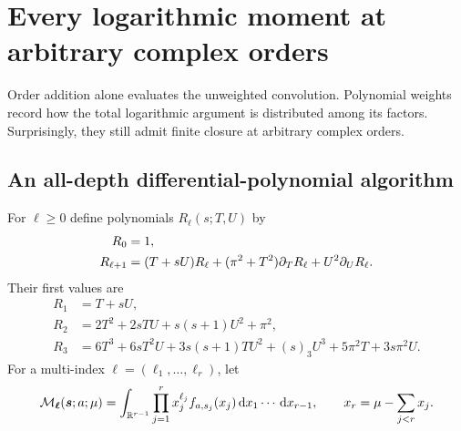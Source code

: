 \section{Every logarithmic moment at arbitrary complex orders}
\label{rlc:sec:moments}

Order addition alone evaluates the unweighted convolution. Polynomial
weights record how the total logarithmic argument is distributed among
its factors. Surprisingly, they still admit finite closure at arbitrary
complex orders.

\subsection{An all-depth differential-polynomial algorithm}
For $\ell\ge0$ define polynomials $R_\ell(s;T,U)$ by
\begin{align}
 R_0&=1,\notag\\
 R_{\ell+1}&=(T+sU)R_\ell+(\pi^2+T^2)\partial_T R_\ell
                        +U^2\partial_U R_\ell.
 \label{rlc:eq:Rrecurrence}
\end{align}
Their first values are
\begin{align*}
 R_1&=T+sU,\\
 R_2&=2T^2+2sTU+s(s+1)U^2+\pi^2,\\
 R_3&=6T^3+6sT^2U+3s(s+1)TU^2+(s)_3U^3
          +5\pi^2T+3s\pi^2U.
\end{align*}
For a multi-index $\boldsymbol\ell=(\ell_1,\ldots,\ell_r)$, let
\begin{equation}\label{rlc:eq:weighteddef}
 \mathcal M_{\boldsymbol\ell}(\boldsymbol s;a;\mu)
 =\int_{\mathbb R^{r-1}}\prod_{j=1}^r
     x_j^{\ell_j}f_{a,s_j}(x_j)\,\mathrm d x_1\cdots\,\mathrm d x_{r-1},
 \qquad x_r=\mu-\sum_{j<r}x_j.
\end{equation}

